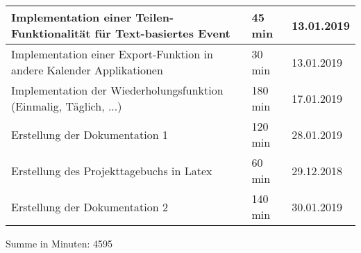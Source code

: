\begin{longtable}{|p{10cm}|p{2cm}|p{2cm}|}
Implementation einer Teilen-Funktionalität für Text-basiertes Event & 45 min & 13.01.2019 \\ \hline
Implementation einer Export-Funktion in andere Kalender Applikationen & 30 min & 13.01.2019 \\ \hline
Implementation der Wiederholungsfunktion (Einmalig, Täglich, ...) & 180 min & 17.01.2019 \\ \hline
Erstellung der Dokumentation 1 & 120 min & 28.01.2019 \\ \hline
Erstellung des Projekttagebuchs in Latex & 60 min & 29.12.2018 \\ \hline
Erstellung der Dokumentation 2 & 140 min & 30.01.2019 \\ \hline
\end{longtable}
Summe in Minuten: 4595

\newpage
